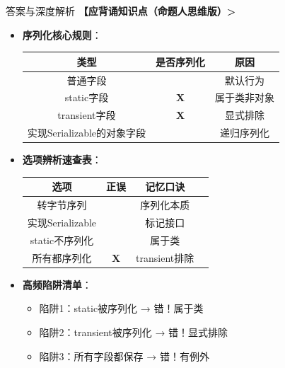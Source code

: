 \documentclass[12pt, a4paper]{ctexart}
\begin{document}
\begin{bluebox}{答案与深度解析}
	\textbf{【应背诵知识点（命题人思维版）>}
	\begin{itemize}[label={}, nosep]
		\item \textbf{序列化核心规则}：
		      \begin{center}
			      \begin{tabular}{|c|c|c|}
				      \hline
				      \textbf{类型}         & \textbf{是否序列化} & \textbf{原因} \\
				      \hline
				      普通字段                & \checkmark     & 默认行为        \\
				      \hline
				      static字段            & \textbf{X}     & 属于类非对象      \\
				      \hline
				      transient字段         & \textbf{X}     & 显式排除        \\
				      \hline
				      实现Serializable的对象字段 & \checkmark     & 递归序列化       \\
				      \hline
			      \end{tabular}
		      \end{center}

		\item \textbf{选项辨析速查表}：
		      \begin{tabular}{|c|c|c|c|}
			      \hline
			      \textbf{选项}    & \textbf{正误} & \textbf{记忆口诀} \\
			      \hline
			      转字节序列          & \checkmark  & 序列化本质         \\
			      \hline
			      实现Serializable & \checkmark  & 标记接口          \\
			      \hline
			      static不序列化     & \checkmark  & 属于类           \\
			      \hline
			      所有都序列化         & \textbf{X}  & transient排除   \\
			      \hline
		      \end{tabular}

		\item \textbf{高频陷阱清单}：
		      \begin{itemize}[label={}, nosep]
			      \item 陷阱1：static被序列化 → 错！属于类
			      \item 陷阱2：transient被序列化 → 错！显式排除
			      \item 陷阱3：所有字段都保存 → 错！有例外
		      \end{itemize}
	\end{itemize}


\end{bluebox}
\end{document}
